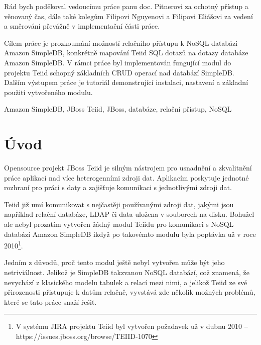 \documentclass[oneside,12pt,final]{fithesis2}
\begin{document}
  
\VerbatimFootnotes
\FrontMatter  
\ThesisTitlePage  

\setcounter{page}{1} 

\begin{ThesisDeclaration}  
\DeclarationText  
\AdvisorName  
\end{ThesisDeclaration}   

\begin{ThesisThanks}  
Rád bych poděkoval vedoucímu práce panu doc. Pitnerovi za ochotný přístup a věnovaný čas, dále také kolegům Filipovi Nguyenovi a Filipovi Eliášovi za vedení a směrování převážně v implementační části práce.
\end{ThesisThanks}  
 
\begin{ThesisAbstract}  
Cílem práce je prozkoumání možností relačního přístupu k NoSQL databázi Amazon SimpleDB, konkrétně mapování Teiid SQL dotazů na dotazy databáze Amazon SimpleDB. V rámci práce byl implementován fungující modul do projektu Teiid schopný základních CRUD operací nad databází SimpleDB. Dalším výstupem práce je tutoriál demonstrující instalaci, nastavení a základní použití vytvořeného modulu.
\end{ThesisAbstract}  
 
\begin{ThesisKeyWords}  
Amazon SimpleDB, JBoss Teiid, JBoss, databáze, relační přístup, NoSQL
\end{ThesisKeyWords}  
 
\MainMatter

\tableofcontents   
\chapter{Úvod}
Opensource projekt JBoss Teiid je silným nástrojem pro usnadnění a zkvalitnění práce aplikací nad více heterogenními zdroji dat. Aplikacím poskytuje jednotné rozhraní pro práci s daty a zajišťuje komunikaci s jednotlivými zdroji dat. 

Teiid již umí komunikovat s nejčastěji používanými zdroji dat, jakými jsou například relační databáze, LDAP či data uložena v souborech na disku. Bohužel ale nebyl prozatím vytvořen žádný modul Teiidu pro komunikaci s NoSQL databází Amazon SimpleDB ikdyž po takovémto modulu byla poptávka už v roce 2010\footnote{V systému JIRA projektu Teiid byl vytvořen požadavek už v dubnu 2010 -- https://issues.jboss.org/browse/TEIID-1070}. 

Jedním z důvodů, proč tento modul ještě nebyl vytvořen může být jeho netriviálnost. Jelikož je SimpleDB takzvanou NoSQL databází, což znamená, že nevychází z klasického modelu tabulek a relací mezi nimi, a jelikož Teiid ze své přirozenosti přistupuje k datům relačně, vyvstává zde několik možných problémů, které se tato práce snaží řešit.
\end{document}
